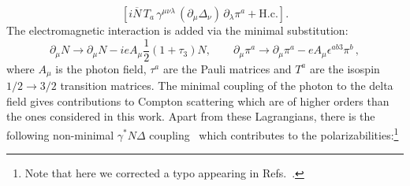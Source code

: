 \documentclass[twocolumn,prc,showpacs,nofootinbib,preprintnumbers,amsmath,amssymb,superscriptaddress]{revtex4-1}
\begin{document}
\begin{widetext}
\begin{equation}
\left[
i \overline N\, T_a%
 \,\gamma^{\mu\nu\lambda}\, (\partial_\mu \Delta_\nu)\, \partial_\lambda\pi^a
+ \mbox{H.c.}\right].
\end{equation}
The electromagnetic interaction is added via the minimal substitution:
\begin{equation}
\partial_\mu N \to  \partial_\mu N -  i e A_\mu\frac{1}{2}(1+\tau_3) N ,\qquad
\partial_\mu \pi^a \to  \partial_\mu \pi^a - eA_\mu\epsilon^{ab3}\pi^b\,,
\end{equation}
where $A_\mu$ is the photon field, $\tau^a$ are the Pauli matrices and
$T^a$ are the isospin $1/2\rightarrow 3/2$ transition matrices. The minimal coupling of the photon to the delta field gives contributions to Compton scattering which are of higher orders than the ones considered in this work. Apart from these Lagrangians, there is the following non-minimal $\gamma^* N \Delta$ coupling~\cite{Pascalutsa:2005ts} which contributes
to the polarizabilities:\footnote{Note that here we corrected a typo appearing in Refs.~\cite{Pascalutsa:2005ts,Pascalutsa:2005vq,Pascalutsa:2006up}.}


\end{widetext}
\end{document}
